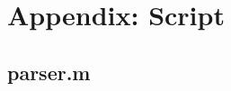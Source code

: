 \documentclass[a4paper,titlepage]{article}
\begin{document}
\begin{figure}[h!]

\hspace*{-\dimexpr\oddsidemargin+1in\relax}\hspace*{-\paperwidth}
\end{figure}

\clearpage
\appendix
\section{Appendix: Script}
\subsection{parser.m}	
{\tt  }
\end{document}
